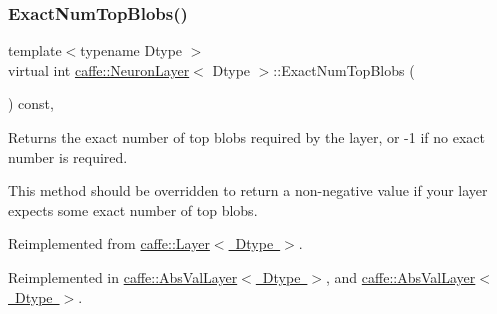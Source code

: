\mbox{\label{classcaffe_1_1_neuron_layer_a47ac5e7208e4b14ad1e4040a621dbfbc}} 
\subsubsection{\texorpdfstring{Exact\+Num\+Top\+Blobs()}{ExactNumTopBlobs()}\hspace{0.1cm}{\footnotesize\ttfamily [2/2]}}
{\footnotesize\ttfamily template$<$typename Dtype $>$ \\
virtual int \mbox{\hyperlink{classcaffe_1_1_neuron_layer}{caffe\+::\+Neuron\+Layer}}$<$ Dtype $>$\+::Exact\+Num\+Top\+Blobs (\begin{DoxyParamCaption}{ }\end{DoxyParamCaption}) const\hspace{0.3cm}{\ttfamily [inline]}, {\ttfamily [virtual]}}



Returns the exact number of top blobs required by the layer, or -\/1 if no exact number is required. 

This method should be overridden to return a non-\/negative value if your layer expects some exact number of top blobs. 

Reimplemented from \mbox{\hyperlink{classcaffe_1_1_layer_a64e2ca72c719e4b2f1f9216ccfb0d37f}{caffe\+::\+Layer$<$ Dtype $>$}}.



Reimplemented in \mbox{\hyperlink{classcaffe_1_1_abs_val_layer_aaf18bf4b77994475e8b55e5cefaa654a}{caffe\+::\+Abs\+Val\+Layer$<$ Dtype $>$}}, and \mbox{\hyperlink{classcaffe_1_1_abs_val_layer_aaf18bf4b77994475e8b55e5cefaa654a}{caffe\+::\+Abs\+Val\+Layer$<$ Dtype $>$}}.

\mbox{\label{classcaffe_1_1_neuron_layer_a2c87bff832b685db76a41cbc8539e7ce}} 

